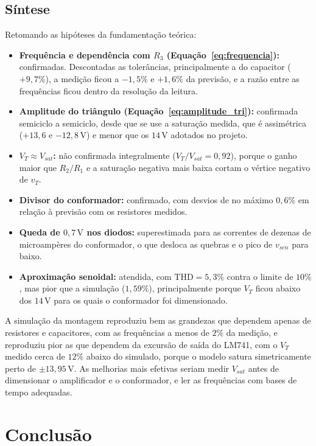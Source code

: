 \documentclass[11pt,a4paper]{article}
\begin{document}
\subsection{Síntese}

Retomando as hipóteses da fundamentação teórica:

\begin{itemize}
    \item \textbf{Frequência e dependência com $R_3$ (Equação~\ref{eq:frequencia}):} confirmadas. Descontadas as tolerâncias, principalmente a do capacitor ($+9{,}7\%$), a medição ficou a $-1{,}5\%$ e $+1{,}6\%$ da previsão, e a razão entre as frequências ficou dentro da resolução da leitura.
    \item \textbf{Amplitude do triângulo (Equação~\ref{eq:amplitude_tri}):} confirmada semiciclo a semiciclo, desde que se use a saturação medida, que é assimétrica ($+13{,}6$ e $-12{,}8\,\text{V}$) e menor que os $14\,\text{V}$ adotados no projeto.
    \item \textbf{$V_T \approx V_{sat}$:} não confirmada integralmente ($V_T/V_{sat} = 0{,}92$), porque o ganho maior que $R_2/R_1$ e a saturação negativa mais baixa cortam o vértice negativo de $v_T$.
    \item \textbf{Divisor do conformador:} confirmado, com desvios de no máximo $0{,}6\%$ em relação à previsão com os resistores medidos.
    \item \textbf{Queda de $0{,}7\,\text{V}$ nos diodos:} superestimada para as correntes de dezenas de microampères do conformador, o que desloca as quebras e o pico de $v_{sen}$ para baixo.
    \item \textbf{Aproximação senoidal:} atendida, com $\text{THD} = 5{,}3\%$ contra o limite de $10\%$, mas pior que a simulação ($1{,}59\%$), principalmente porque $V_T$ ficou abaixo dos $14\,\text{V}$ para os quais o conformador foi dimensionado.
\end{itemize}

A simulação da montagem reproduziu bem as grandezas que dependem apenas de resistores e capacitores, com as frequências a menos de $2\%$ da medição, e reproduziu pior as que dependem da excursão de saída do LM741, com o $V_T$ medido cerca de $12\%$ abaixo do simulado, porque o modelo satura simetricamente perto de $\pm13{,}95\,\text{V}$. As melhorias mais efetivas seriam medir $V_{sat}$ antes de dimensionar o amplificador e o conformador, e ler as frequências com bases de tempo adequadas.

\section{Conclusão}
\end{document}
